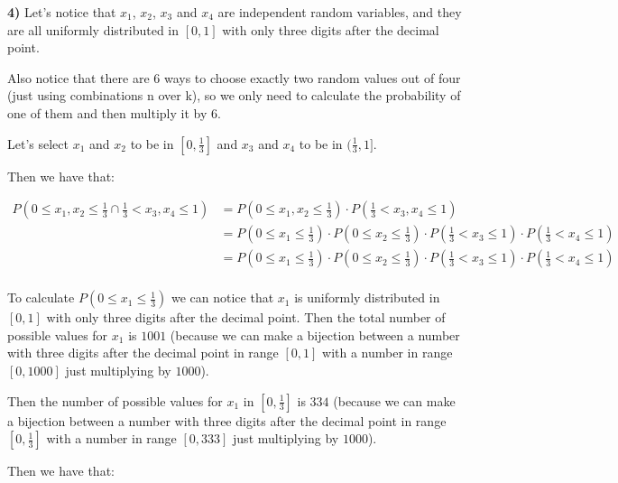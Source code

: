                 \textbf{4)} Let's notice that $x_1$, $x_2$, $x_3$ and $x_4$ are independent
                random variables, and they are all uniformly distributed in $[0,1]$
                with only three digits after the decimal point.

                Also notice that there are $6$ ways to choose exactly two random
                values out of four (just using combinations n over k), so we only need to calculate the probability of
                one of them and then multiply it by $6$.

                Let's select $x_1$ and $x_2$ to be in $[0, \frac{1}{3}]$ and $x_3$ and
            $x_4$ to be in $(\frac{1}{3}, 1]$.

Then we have that:

\begin{equation*}
    \begin{split}
        P(0 \leq x_1, x_2 \leq \frac{1}{3} \cap \frac{1}{3} < x_3, x_4 \leq1) & =P(0 \leq x_1, x_2 \leq \frac{1}{3}) \cdot P(\frac{1}{3} < x_3, x_4 \leq1)                                                             \\
                                                                              & =P(0 \leq x_1 \leq \frac{1}{3}) \cdot P(0 \leq x_2 \leq \frac{1}{3}) \cdot P(\frac{1}{3} < x_3 \leq1) \cdot P(\frac{1}{3} < x_4 \leq1) \\
                                                                              & =P(0 \leq x_1 \leq \frac{1}{3}) \cdot P(0 \leq x_2 \leq \frac{1}{3}) \cdot P(\frac{1}{3} < x_3 \leq1) \cdot P(\frac{1}{3} < x_4 \leq1) \\
    \end{split}
\end{equation*}

To calculate $P(0 \leq x_1 \leq \frac{1}{3})$ we can notice that $x_1$ is
uniformly distributed in $[0,1]$ with only three digits after the
decimal point. Then the total number of possible values for $x_1$ is
$1001$ (because we can make a bijection between a number with three
digits after the decimal point in range $[0,1]$ with a number in
range $[0,1000]$ just multiplying by $1000$).

Then the number of possible values for $x_1$ in $[0, \frac{1}{3}]$ is $334$ (because we can make a bijection between a number with three
digits after the decimal point in range $[0,\frac{1}{3}]$ with a
number in range $[0,333]$ just multiplying by $1000$).

Then we have that:

